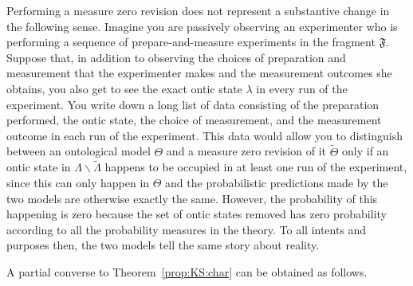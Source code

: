 \documentclass[DIV=calc,fontsize=12pt]{scrartcl} %
\theoremstyle{definition}
\theoremstyle{plain}
\begin{document}
Performing a measure zero revision does not represent a substantive
change in the following sense.  Imagine you are passively observing an
experimenter who is performing a sequence of prepare-and-measure
experiments in the fragment $\mathfrak{F}$.  Suppose that, in addition
to observing the choices of preparation and measurement that the
experimenter makes and the measurement outcomes she obtains, you also
get to see the exact ontic state $\lambda$ in every run of the
experiment.  You write down a long list of data consisting of the
preparation performed, the ontic state, the choice of measurement, and
the measurement outcome in each run of the experiment.  This data
would allow you to distinguish between an ontological model $\Theta$
and a measure zero revision of it $\tilde{\Theta}$ only if an ontic
state in $\Lambda \backslash \tilde{\Lambda}$ happens to be occupied
in at least one run of the experiment, since this can only happen in
$\Theta$ and the probabilistic predictions made by the two models are
otherwise exactly the same.  However, the probability of this
happening is zero because the set of ontic states removed has zero
probability according to all the probability measures in the theory.
To all intents and purposes then, the two models tell the same story
about reality.

A partial converse to Theorem~\ref{prop:KS:char} can be obtained
as follows.
\end{document}
